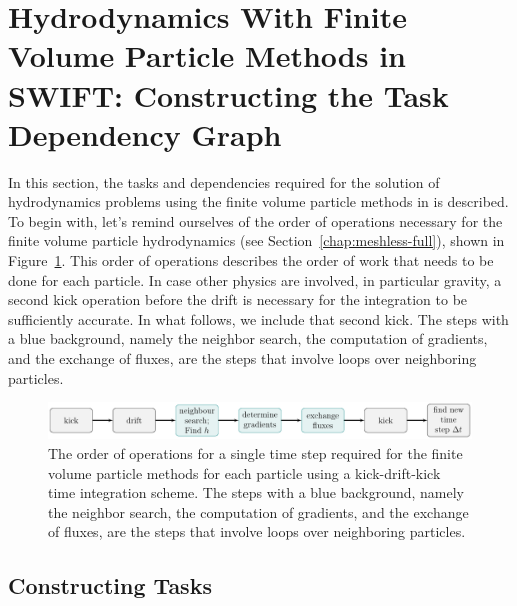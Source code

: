 \section[FVPM In \swift: Task Dependency Graph]{Hydrodynamics With Finite Volume Particle Methods
in SWIFT: Constructing the Task Dependency Graph}\label{chap:swift-hydro-tasks}

In this section, the tasks and dependencies required for the solution of hydrodynamics problems
using the finite volume particle methods in \swift is described. To begin with, let's remind
ourselves of the order of operations necessary for the finite volume particle hydrodynamics (see
Section~\ref{chap:meshless-full}), shown in Figure~\ref{fig:meshless-order-of-operations}. This
order of operations describes the order of work that needs to be done for each particle. In case
other physics are involved, in particular gravity, a second kick operation before the drift is
necessary for the integration to be sufficiently accurate. In what follows, we include that second
kick. The steps with a blue background, namely the neighbor search, the computation of gradients,
and the exchange of fluxes, are the steps that involve loops over neighboring particles.


\begin{figure}[H]
\centering
\includegraphics[width=\linewidth]{figures/Meshless/meshless_order_of_operations.pdf}%
\caption{The order of operations for a single time step required for the finite volume particle
methods for each particle using a kick-drift-kick time integration scheme. The steps with a blue
background, namely the neighbor search, the computation of gradients, and the exchange of fluxes,
are the steps that involve loops over neighboring particles.}
\label{fig:meshless-order-of-operations}
\end{figure}





\subsection{Constructing Tasks}

